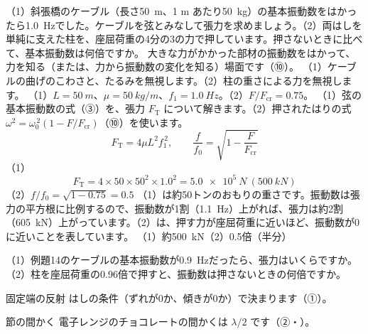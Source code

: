 \label{ph:波-6:ex14}
\begin{phreidai}[振動数から力を知る]
（1）斜張橋のケーブル（長さ\qty{50}{m}、1 m あたり\qty{50}{kg}）の基本振動数をはかったら\qty{1.0}{Hz}でした。ケーブルを弦とみなして張力を求めましょう。（2）両はしを単純に支えた柱を、座屈荷重の4分の3の力で押しています。押さないときに比べて、基本振動数は何倍ですか。
\phbamen
大きな力がかかった部材の振動数をはかって、力を知る（または、力から振動数の変化を知る）場面です（⑩）。
\phmushi
（1）ケーブルの曲げのこわさと、たるみを無視します。（2）柱の重さによる力を無視します。
\phzu
（1）$L=\qty{50}{m}$、$\mu=\qty{50}{kg/m}$、$f_1=\qty{1.0}{Hz}$。（2）$F/F_{\mathrm{cr}}=0.75$。
\phriyu
（1）弦の基本振動数の式（③）を、張力 $F_{\mathrm T}$ について解きます。（2）押されたはりの式 $\omega^2=\omega_0^{\,2}(1-F/F_{\mathrm{cr}})$（⑩）を使います。
\phtateru
\[F_{\mathrm T}=4\mu L^2f_1^{\,2},\qquad\frac{f}{f_0}=\sqrt{1-\frac{F}{F_{\mathrm{cr}}}}\]
\phtoku
（1）\[F_{\mathrm T}=4\times50\times50^2\times1.0^2=\qty{5.0e5}{N}\ (\qty{500}{kN})\]
（2）$f/f_0=\sqrt{1-0.75}=0.5$
\phtashikame
（1）は約50トンのおもりの重さです。振動数は張力の平方根に比例するので、振動数が1割（\qty{1.1}{Hz}）上がれば、張力は約2割（\qty{605}{kN}）上がっています。（2）は、押す力が座屈荷重に近いほど、振動数が0に近いことを表しています。
\kotae （1）約\qty{500}{kN}（2）0.5倍（半分）
\end{phreidai}
\begin{jibun}
（1）例題14のケーブルの基本振動数が\qty{0.9}{Hz}だったら、張力はいくらですか。（2）柱を座屈荷重の0.96倍で押すと、振動数は押さないときの何倍ですか。
\end{jibun}

\begin{tsumazuki}{固定端の反射}
はしの条件（ずれが0か、傾きが0か）で決まります（①）。
\end{tsumazuki}

\begin{tsumazuki}{節の間かく}
電子レンジのチョコレートの間かくは $\lambda/2$ です（②・）。
\end{tsumazuki}

